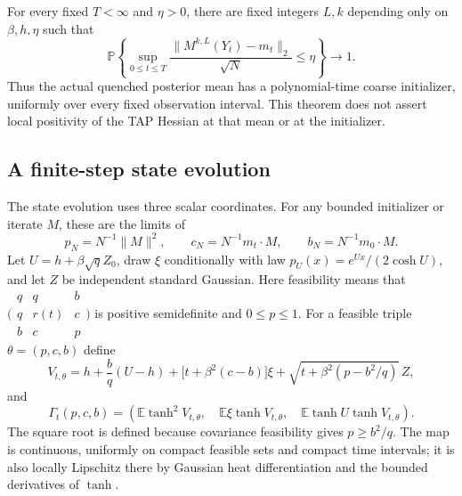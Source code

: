 \documentclass[11pt,reqno]{amsart}
\begin{document}
\begin{thm}\label{thm:initializer}
For every fixed $T<\infty$ and $\eta>0$, there are fixed integers $L,k$
depending only on $\beta,h,\eta$ such that
\[
 \mathbb P\left\{
 \sup_{0\le t\le T}\frac{\|M^{k,L}(Y_t)-m_t\|_2}{\sqrt N}\le\eta
 \right\}\longrightarrow1.
\]
Thus the actual quenched posterior mean has a polynomial-time coarse
initializer, uniformly over every fixed observation interval.
This theorem does not assert local positivity of the TAP Hessian at that
mean or at the initializer.
\end{thm}

\subsection{A finite-step state evolution}

The state evolution uses three scalar coordinates.  For any bounded
initializer or iterate $M$, these are the limits of
\[
 p_N=N^{-1}\|M\|^2,\qquad
 c_N=N^{-1}m_t\cdot M,\qquad
 b_N=N^{-1}m_0\cdot M.
\]
Let $U=h+\beta\sqrt q Z_0$, draw $\xi$ conditionally with law
$p_U(x)=e^{Ux}/(2\cosh U)$, and let $Z$ be independent standard Gaussian.
Here feasibility means that
$\bigl(\begin{smallmatrix}q&q&b\\q&r(t)&c\\b&c&p\end{smallmatrix}\bigr)$
is positive semidefinite and $0\le p\le1$.
For a feasible triple $\theta=(p,c,b)$ define
\[
 V_{t,\theta}
 =h+\frac bq(U-h)+\bigl[t+\beta^2(c-b)\bigr]\xi
       +\sqrt{t+\beta^2(p-b^2/q)}\,Z,
\]
and
\[
 \Gamma_t(p,c,b)=
 \left(
 \mathbb E\tanh^2V_{t,\theta},\quad
 \mathbb E\xi\tanh V_{t,\theta},\quad
 \mathbb E\tanh U\tanh V_{t,\theta}
 \right).
\]
The square root is defined because covariance feasibility gives
$p\ge b^2/q$.  The map is continuous, uniformly on compact feasible
sets and compact time intervals; it is also locally Lipschitz there by
Gaussian heat differentiation and the bounded derivatives of $\tanh$.
\end{document}
